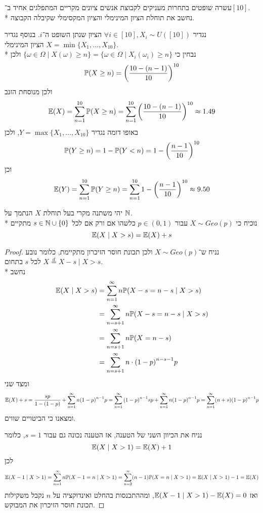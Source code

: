 \subquestion{}
עשרה שופטים בתחרות מעניקים לקבוצת אנשים ציונים מקריים המתפלגים אחיד ב־$[10]$. \\*
נחשב את תוחלת הציון המינימלי והציון המקסימלי שקיבלה הקבוצה.
\begin{solution}
	נגדיר $\forall i \in [10], X_i \sim U([10])$ הציון שנתן השופט ה־$i$. בנוסף נגדיר $X = \min\{ X_1, \dots, X_{10} \}$ הציון המינימלי. \\*
	נבחין כי $\{ \omega \in \Omega \mid X(\omega) \ge n \} = \{ \omega \in \Omega \mid X_i(\omega_i) \ge n \}$ ולכן
	\[
		\mathbb{P}(X \ge n)
		= {\left(\frac{10 - (n - 1)}{10}\right)}^{10}
	\]
	ולכן מנוסחת הזנב
	\[
		\mathbb{E}(X)
		= \sum_{n = 1}^{10} \mathbb{P}(X \ge n)
		= \sum_{n = 1}^{10} {\left(\frac{10 - (n - 1)}{10}\right)}^{10}
		\approx 1.49
	\]
	באופו דומה נגדיר $Y = \max\{ X_1, \dots, X_{10} \}$, ולכן
	\[
		\mathbb{P}(Y \ge n)
		= 1 - \mathbb{P}(Y < n)
		= 1 - {\left(\frac{n - 1}{10}\right)}^{10}
	\]
	וכן
	\[
		\mathbb{E}(Y)
		= \sum_{n = 1}^{10} \mathbb{P}(Y \ge n)
		= \sum_{n = 1}^{10} 1 - {\left(\frac{n - 1}{10}\right)}^{10}
		\approx 9.50
	\]
\end{solution}

\question{}
יהי משתנה מקרי בעל תוחלת $X$ הנתמך על $\mathbb{N}$. \\*
נוכיח כי $X \sim Geo(p)$ עבור $p \in (0, 1)$ כלשהו אם ורק אם לכל $s \in \mathbb{N} \cup \{0\}$ מתקיים
\[
	\mathbb{E}(X \mid X > s) = \mathbb{E}(X) + s
\]
\begin{proof}
	נניח ש־$X \sim Geo(p)$ ולכן תכונת חוסר הזיכרון מתקיימת, כלומר נובע $X \overset{d}{=} X - s \mid X > s$ לכל $s$ בתחום. \\*
	נחשב
	\begin{align*}
		\mathbb{E}(X \mid X > s)
		& = \sum_{n = 1}^{\infty} n \mathbb{P}(X - s = n - s \mid X > s) \\
		& = \sum_{n = s + 1}^{\infty} n \mathbb{P}(X - s = n - s \mid X > s) \\
		& = \sum_{n = s + 1}^{\infty} n \mathbb{P}(X = n - s) \\
		& = \sum_{n = s + 1}^\infty n \cdot {(1 - p)}^{n - s - 1} p
	\end{align*}
	ומצד שני
	\[
		\mathbb{E}(X) + s
		= \frac{s p}{1 - (1 - p)} + \sum_{n = 1}^{\infty} n {(1 - p)}^{n - 1} p
		= \sum_{n = 1}^{\infty} {(1 - p)}^{n - 1} s p + \sum_{n = 1}^{\infty} n {(1 - p)}^{n - 1} p
		= \sum_{n = 1}^{\infty} (n + s) {(1 - p)}^{n - 1} p
	\]
	ומצאנו כי הביטויים שווים.

	נניח את הכיוון השני של הטענה, אז הטענה נכונה גם עבור $s = 1$, כלומר
	\[
		\mathbb{E}(X \mid X > 1) = \mathbb{E}(X) + 1
	\]
	לכן
	\[
		\mathbb{E}(X - 1 \mid X > 1)
		= \sum_{n = 1}^{\infty} n \mathbb{P}(X - 1 = n \mid X > 1)
		= \sum_{n = 2}^{\infty} (n - 1) \mathbb{P}(X = n \mid X > 1)
		= \mathbb{E}(X \mid X > 1) - 1
		= \mathbb{E}(X)
	\]
	ואז $\mathbb{E}(X - 1 \mid X > 1) - \mathbb{E}(X) = 0$, ומההתכנסות בהחלט ואינדוקציה על $n$ נקבל משקילות תכונת חוסר הזיכרון את המבוקש.
\end{proof}

